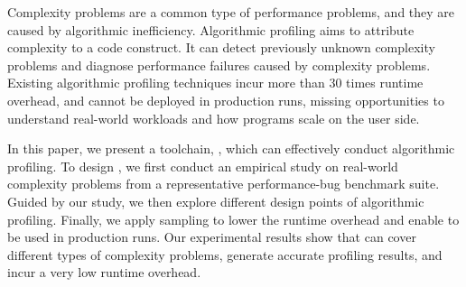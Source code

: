 Complexity problems are a common type of performance problems, 
and they are caused by algorithmic inefficiency. 
Algorithmic profiling aims to attribute complexity to a code construct.
It can detect previously unknown complexity problems and diagnose performance failures 
caused by complexity problems. 
Existing algorithmic profiling techniques
incur more than $30$ times runtime overhead,
and cannot be deployed in production runs, missing opportunities to understand 
real-world workloads and how programs scale on the user side. 

In this paper, we present a toolchain, \Tool, 
which can effectively conduct algorithmic profiling. 
To design \Tool, we first conduct an empirical study on 
real-world complexity problems from a representative performance-bug benchmark suite. 
Guided by our study, 
we then explore different 
design points of algorithmic profiling.
Finally, we apply sampling to lower the runtime 
overhead and enable \Tool to be used in production runs.
Our experimental results show that \Tool 
can cover different types of complexity problems, 
generate accurate profiling results, 
and incur a very low runtime overhead. 

